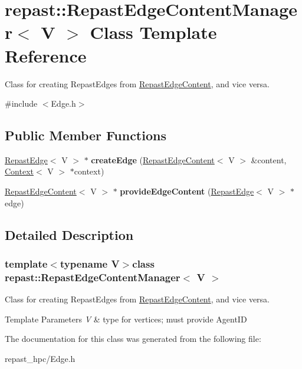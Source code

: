 \hypertarget{classrepast_1_1_repast_edge_content_manager}{\section{repast\-:\-:Repast\-Edge\-Content\-Manager$<$ V $>$ Class Template Reference}
\label{classrepast_1_1_repast_edge_content_manager}
}


Class for creating Repast\-Edges from \hyperlink{structrepast_1_1_repast_edge_content}{Repast\-Edge\-Content}, and vice versa.  




{\ttfamily \#include $<$Edge.\-h$>$}

\subsection*{Public Member Functions}
\begin{DoxyCompactItemize}
\item 
\hypertarget{classrepast_1_1_repast_edge_content_manager_a13d9f23ad211f3c9bebf7992cd72b948}{\hyperlink{classrepast_1_1_repast_edge}{Repast\-Edge}$<$ V $>$ $\ast$ {\bfseries create\-Edge} (\hyperlink{structrepast_1_1_repast_edge_content}{Repast\-Edge\-Content}$<$ V $>$ \&content, \hyperlink{classrepast_1_1_context}{Context}$<$ V $>$ $\ast$context)}\label{classrepast_1_1_repast_edge_content_manager_a13d9f23ad211f3c9bebf7992cd72b948}

\item 
\hypertarget{classrepast_1_1_repast_edge_content_manager_abf4f43f36532b640ad1d6bee1ea39307}{\hyperlink{structrepast_1_1_repast_edge_content}{Repast\-Edge\-Content}$<$ V $>$ $\ast$ {\bfseries provide\-Edge\-Content} (\hyperlink{classrepast_1_1_repast_edge}{Repast\-Edge}$<$ V $>$ $\ast$edge)}\label{classrepast_1_1_repast_edge_content_manager_abf4f43f36532b640ad1d6bee1ea39307}

\end{DoxyCompactItemize}


\subsection{Detailed Description}
\subsubsection*{template$<$typename V$>$class repast\-::\-Repast\-Edge\-Content\-Manager$<$ V $>$}

Class for creating Repast\-Edges from \hyperlink{structrepast_1_1_repast_edge_content}{Repast\-Edge\-Content}, and vice versa. 


\begin{DoxyTemplParams}{Template Parameters}
{\em V} & type for vertices; must provide Agent\-I\-D \\
\hline
\end{DoxyTemplParams}


The documentation for this class was generated from the following file\-:\begin{DoxyCompactItemize}
\item 
repast\-\_\-hpc/Edge.\-h\end{DoxyCompactItemize}
